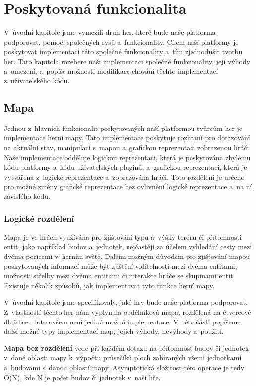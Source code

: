\section{Poskytovaná funkcionalita}
V~úvodní kapitole jsme vymezili druh her, které bude naše platforma podporovat, pomocí společných rysů a~funkcionality. Cílem naší platformy je poskytovat implementaci této společné funkcionality a~tím zjednodušit tvorbu her. Tato kapitola rozebere naši implementaci společné funkcionality, její výhody a~omezení, a~popíše možnosti modifikace chování těchto implementací z~uživatelského kódu.

\subsection{Mapa}
\label{sec:mapimpl}
Jednou z~hlavních funkcionalit poskytovaných naší platformou tvůrcům her je implementace herní mapy. Tato implementace poskytuje rozhraní pro dotazování na aktuální stav, manipulaci s~mapou a~grafickou reprezentaci zobrazenou hráči. Naše implementace odděluje logickou reprezentaci, která je poskytována zbylému kódu platformy a~kódu uživatelských pluginů, a~grafickou reprezentaci, která je vytvářena z~logické reprezentace a~zobrazována hráči. Toto rozdělení je určeno pro možné změny grafické reprezentace bez ovlivnění logické reprezentace a~na ní závislého kódu. 

\subsubsection{Logické rozdělení}
\label{sec:maplogic}
Mapa je ve hrách využívána pro zjišťování typu a~výšky terénu či přítomnosti entit, jako například budov a~jednotek, nejčastěji za účelem vyhledání cesty mezi dvěma pozicemi v~herním světě. Dalším možným důvodem pro zjišťování mapou poskytovaných informací může být zjištění viditelnosti mezi dvěma entitami, možnosti střelby mezi dvěma entitami či interakce hráče se skupinami entit.  Existuje několik způsobů, jak implementovat tyto funkce herní mapy.

V~úvodní kapitole jsme specifikovaly, jaké hry bude naše platforma podporovat. Z~vlastností těchto her nám vyplynula obdélníková mapa, rozdělená na čtvercové dlaždice. Toto ovšem není jediná možná implementace. V~této části popíšeme další možné typy implementací map, jejich výhody, nevýhody a~použití.

\textbf{Mapa bez rozdělení} vede při každém dotazu na přítomnost budov či jednotek v~dané oblasti mapy k~výpočtu průsečíků ploch zabíraných všemi jednotkami a~budovami s~danou oblastí mapy. Asymptotická složitost této operace je tedy O(N), kde N je počet budov či jednotek v~naší hře.

